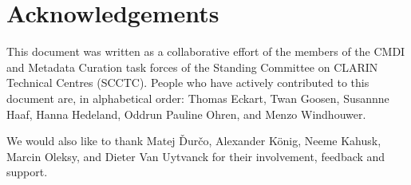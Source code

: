 \section{Acknowledgements}
This document was written as a collaborative effort of the members of the CMDI and Metadata Curation task forces of the Standing Committee on CLARIN Technical Centres (SCCTC). People who have actively contributed to this document are, in alphabetical order: 
Thomas Eckart,
Twan Goosen,
Susannne Haaf, 
Hanna Hedeland,
Oddrun Pauline Ohren, 
and Menzo Windhouwer.

We would also like to thank 
Matej Ďurčo,
Alexander König,
Neeme Kahusk,
Marcin Oleksy,
and Dieter Van Uytvanck
for their involvement, feedback and support.